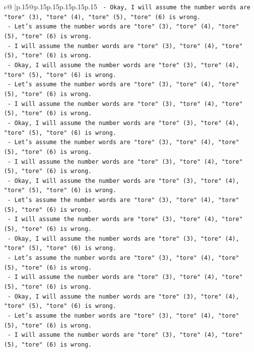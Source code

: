 \documentclass{article}
\begin{document}
{\begin{supertabular}{c@{$\;$}|p{.15\linewidth}@{}p{.15\linewidth}p{.15\linewidth}p{.15\linewidth}p{.15\linewidth}p{.15\linewidth}}
{{{\texttt{  {-} Okay, I will assume the number words are "tore" (3), "tore" (4), "tore" (5), "tore" (6) is wrong.} \\
\texttt{  {-} Let's assume the number words are "tore" (3), "tore" (4), "tore" (5), "tore" (6) is wrong.} \\
\texttt{  {-} I will assume the number words are "tore" (3), "tore" (4), "tore" (5), "tore" (6) is wrong.} \\
\texttt{  {-} Okay, I will assume the number words are "tore" (3), "tore" (4), "tore" (5), "tore" (6) is wrong.} \\
\texttt{  {-} Let's assume the number words are "tore" (3), "tore" (4), "tore" (5), "tore" (6) is wrong.} \\
\texttt{  {-} I will assume the number words are "tore" (3), "tore" (4), "tore" (5), "tore" (6) is wrong.} \\
\texttt{  {-} Okay, I will assume the number words are "tore" (3), "tore" (4), "tore" (5), "tore" (6) is wrong.} \\
\texttt{  {-} Let's assume the number words are "tore" (3), "tore" (4), "tore" (5), "tore" (6) is wrong.} \\
\texttt{  {-} I will assume the number words are "tore" (3), "tore" (4), "tore" (5), "tore" (6) is wrong.} \\
\texttt{  {-} Okay, I will assume the number words are "tore" (3), "tore" (4), "tore" (5), "tore" (6) is wrong.} \\
\texttt{  {-} Let's assume the number words are "tore" (3), "tore" (4), "tore" (5), "tore" (6) is wrong.} \\
\texttt{  {-} I will assume the number words are "tore" (3), "tore" (4), "tore" (5), "tore" (6) is wrong.} \\
\texttt{  {-} Okay, I will assume the number words are "tore" (3), "tore" (4), "tore" (5), "tore" (6) is wrong.} \\
\texttt{  {-} Let's assume the number words are "tore" (3), "tore" (4), "tore" (5), "tore" (6) is wrong.} \\
\texttt{  {-} I will assume the number words are "tore" (3), "tore" (4), "tore" (5), "tore" (6) is wrong.} \\
\texttt{  {-} Okay, I will assume the number words are "tore" (3), "tore" (4), "tore" (5), "tore" (6) is wrong.} \\
\texttt{  {-} Let's assume the number words are "tore" (3), "tore" (4), "tore" (5), "tore" (6) is wrong.} \\
\texttt{  {-} I will assume the number words are "tore" (3), "tore" (4), "tore" (5), "tore" (6) is wrong.} \\
}}}
\end{supertabular}}
\end{document}
